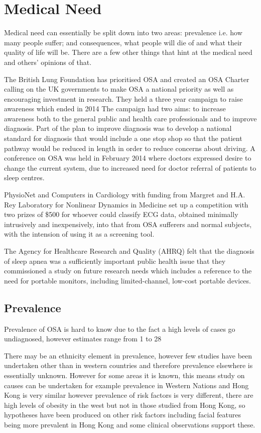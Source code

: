 \section{Medical Need}

Medical need can essentially be split down into two areas: prevalence i.e. how many people suffer; and consequences, what people will die of and what their quality of life will be. There are a few other things that hint at the medical need and others’ opinions of that. 

The British Lung Foundation has prioritised OSA and created an OSA Charter calling on the UK governments to make OSA a national priority as well as encouraging investment in research. They held a three year campaign to raise awareness which ended in 2014 The campaign had two aims: to increase awareness both to the general public and health care professionals and to improve diagnosis. Part of the plan to improve diagnosis was to develop a national standard for diagnosis that would include a one stop shop so that the patient pathway would be reduced in length in order to reduce concerns about driving. A conference on OSA was held in February 2014 where doctors expressed desire to change the current system, due to increased need for doctor referral of patients to sleep centres. 

PhysioNet and Computers in Cardiology with funding from Margret and H.A. Rey Laboratory for Nonlinear Dynamics in Medicine set up a competition with two prizes of \$500 for whoever could classify ECG data, obtained minimally intrusively and inexpensively, into that from OSA sufferers and normal subjects, with the intension of using it as a screening tool. 

The Agency for Healthcare Research and Quality (AHRQ) felt that the diagnosis of sleep apnea was a sufficiently important public health issue that they commissioned a study on future research needs which includes a reference to the need for portable monitors, including limited-channel, low-cost portable devices.

\subsection{Prevalence}

Prevalence of OSA is hard to know due to the fact a high levels of cases go undiagnosed, however estimates range from 1 to 28%

There may be an ethnicity element in prevalence, however few studies have been undertaken other than in western countries and therefore prevalence elsewhere is essentially unknown. However for some areas it is known, this means study on causes can be undertaken for example prevalence in Western Nations and Hong Kong is very similar however prevalence of risk factors is very different, there are high levels of obesity in the west but not in those studied from Hong Kong, so hypotheses have been produced on other risk factors including facial features being more prevalent in Hong Kong and some clinical observations support these. 

